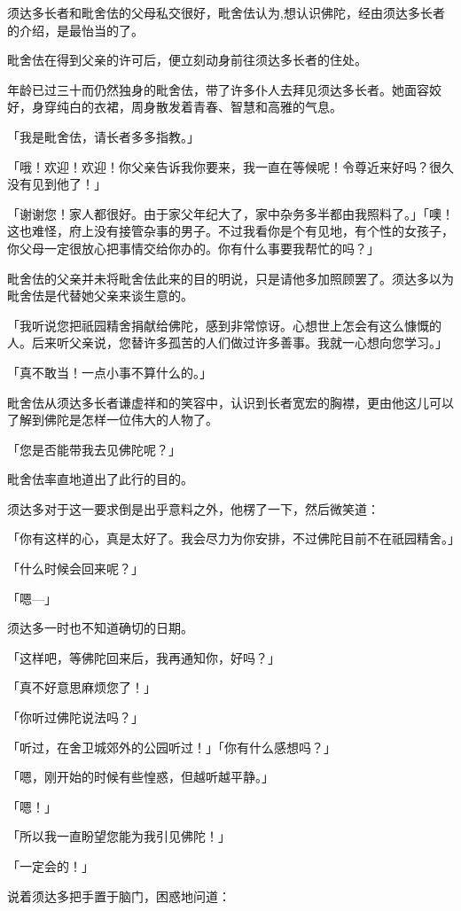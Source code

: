 \documentclass[twoside,openany]{book}
\begin{document}
须达多长者和毗舍佉的父母私交很好，毗舍佉认为,想认识佛陀，经由须达多长者的介绍，是最怡当的了。

毗舍佉在得到父亲的许可后，便立刻动身前往须达多长者的住处。

年龄已过三十而仍然独身的毗舍佉，带了许多仆人去拜见须达多长者。她面容姣好，身穿纯白的衣裙，周身散发着青春、智慧和高雅的气息。

「我是毗舍佉，请长者多多指教。」

「哦！欢迎！欢迎！你父亲告诉我你要来，我一直在等候呢！令尊近来好吗？很久没有见到他了！」

「谢谢您！家人都很好。由于家父年纪大了，家中杂务多半都由我照料了。」「噢！这也难怪，府上没有接管杂事的男子。不过我看你是个有见地，有个性的女孩子，你父母一定很放心把事情交给你办的。你有什么事要我帮忙的吗？」

毗舍佉的父亲并未将毗舍佉此来的目的明说，只是请他多加照顾罢了。须达多以为毗舍佉是代替她父亲来谈生意的。

「我听说您把祇园精舍捐献给佛陀，感到非常惊讶。心想世上怎会有这么慷慨的人。后来听父亲说，您替许多孤苦的人们做过许多善事。我就一心想向您学习。」

「真不敢当！一点小事不算什么的。」

毗舍佉从须达多长者谦虚祥和的笑容中，认识到长者宽宏的胸襟，更由他这儿可以了解到佛陀是怎样一位伟大的人物了。

「您是否能带我去见佛陀呢？」

毗舍佉率直地道出了此行的目的。

须达多对于这一要求倒是出乎意料之外，他楞了一下，然后微笑道：

「你有这样的心，真是太好了。我会尽力为你安排，不过佛陀目前不在祇园精舍。」

「什么时候会回来呢？」

「嗯---」

须达多一时也不知道确切的日期。

「这样吧，等佛陀回来后，我再通知你，好吗？」

「真不好意思麻烦您了！」

「你听过佛陀说法吗？」

「听过，在舍卫城郊外的公园听过！」「你有什么感想吗？」

「嗯，刚开始的时候有些惶惑，但越听越平静。」

「嗯！」

「所以我一直盼望您能为我引见佛陀！」

「一定会的！」

说着须达多把手置于脑门，困惑地问道：
\end{document}
